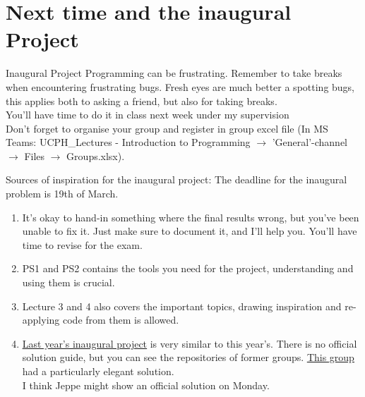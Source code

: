 \documentclass[10pt,danish,t,10pt]{beamer}
\begin{document}
\section{Next time and the inaugural Project}
\begin{frame}{Inaugural Project}
    Programming can be frustrating. Remember to take breaks when encountering frustrating bugs. Fresh eyes are much better a spotting bugs, this applies both to asking a friend, but also for taking breaks. \\
    You'll have time to do it in class next week under my supervision \\
    Don't forget to organise your group and register in group excel file (In MS Teams: UCPH\_Lectures - Introduction to Programming $\rightarrow$ 'General'-channel $\rightarrow$ Files $\rightarrow$ Groups.xlsx).
    
\end{frame}

\begin{frame}{Sources of inspiration for the inaugural project:}
    The deadline for the inaugural problem is 19th of March.
    \begin{enumerate}
        \item It's okay to hand-in something where the final results wrong, but you've been unable to fix it. Just make sure to document it, and I'll help you. You'll have time to revise for the exam.
        \item PS1 and PS2 contains the tools you need for the project, understanding and using them is crucial.
        \item Lecture 3 and 4 also covers the important topics, drawing inspiration and re-applying code from them is allowed. 
        \item \href{https://github.com/NumEconCopenhagen/lectures-2020/blob/master/projects/InauguralProject.pdf}{\underline{Last year's inaugural project}} is very similar to this year's. There is no official solution guide, but you can see the repositories of former groups. \href{https://github.com/NumEconCopenhagen/projects-2020-kongeraekken-1/tree/master/inauguralproject}{\underline{This group}} had a particularly elegant solution. \\ 
        I think Jeppe might show an official solution on Monday. 
    \end{enumerate}
    
\end{frame}
\end{document}
